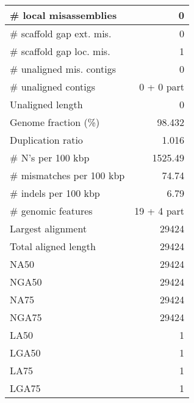 \documentclass[12pt,a4paper]{article}
\begin{document}
\begin{table}[ht]
\begin{center}
\begin{tabular}{|l*{1}{|r}|}
\# local misassemblies & 0 \\ \hline
\# scaffold gap ext. mis. & 0 \\ \hline
\# scaffold gap loc. mis. & 1 \\ \hline
\# unaligned mis. contigs & 0 \\ \hline
\# unaligned contigs & 0 + 0 part \\ \hline
Unaligned length & 0 \\ \hline
Genome fraction (\%) & 98.432 \\ \hline
Duplication ratio & 1.016 \\ \hline
\# N's per 100 kbp & 1525.49 \\ \hline
\# mismatches per 100 kbp & 74.74 \\ \hline
\# indels per 100 kbp & 6.79 \\ \hline
\# genomic features & 19 + 4 part \\ \hline
Largest alignment & 29424 \\ \hline
Total aligned length & 29424 \\ \hline
NA50 & 29424 \\ \hline
NGA50 & 29424 \\ \hline
NA75 & 29424 \\ \hline
NGA75 & 29424 \\ \hline
LA50 & 1 \\ \hline
LGA50 & 1 \\ \hline
LA75 & 1 \\ \hline
LGA75 & 1 \\ \hline
\end{tabular}
\end{center}
\end{table}
\end{document}
